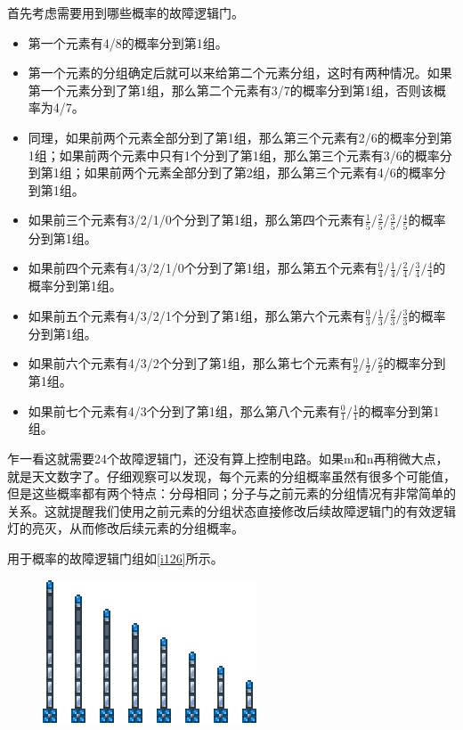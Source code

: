 首先考虑需要用到哪些概率的故障逻辑门。
\begin{itemize}
\item 第一个元素有4/8的概率分到第1组。
\item 第一个元素的分组确定后就可以来给第二个元素分组，这时有两种情况。如果第一个元素分到了第1组，那么第二个元素有3/7的概率分到第1组，否则该概率为4/7。
\item 同理，如果前两个元素全部分到了第1组，那么第三个元素有2/6的概率分到第1组；如果前两个元素中只有1个分到了第1组，那么第三个元素有3/6的概率分到第1组；如果前两个元素全部分到了第2组，那么第三个元素有4/6的概率分到第1组。
\item 如果前三个元素有3/2/1/0个分到了第1组，那么第四个元素有$\frac{1}{5}/\frac{2}{5}/\frac{3}{5}/\frac{4}{5}$的概率分到第1组。
\item 如果前四个元素有4/3/2/1/0个分到了第1组，那么第五个元素有$\frac{0}{4}/\frac{1}{4}/\frac{2}{4}/\frac{3}{4}/\frac{4}{4}$的概率分到第1组。
\item 如果前五个元素有4/3/2/1个分到了第1组，那么第六个元素有$\frac{0}{3}/\frac{1}{3}/\frac{2}{3}/\frac{3}{3}$的概率分到第1组。
\item 如果前六个元素有4/3/2个分到了第1组，那么第七个元素有$\frac{0}{2}/\frac{1}{2}/\frac{2}{2}$的概率分到第1组。
\item 如果前七个元素有4/3个分到了第1组，那么第八个元素有$\frac{0}{1}/\frac{1}{1}$的概率分到第1组。
\end{itemize}

乍一看这就需要24个故障逻辑门，还没有算上控制电路。如果m和n再稍微大点，就是天文数字了。仔细观察可以发现，每个元素的分组概率虽然有很多个可能值，但是这些概率都有两个特点：分母相同；分子与之前元素的分组情况有非常简单的关系。这就提醒我们使用之前元素的分组状态直接修改后续故障逻辑门的有效逻辑灯的亮灭，从而修改后续元素的分组概率。

用于概率的故障逻辑门组如\autoref{i126}所示。

\begin{figure}[!ht]
\centering
\includegraphics{images/126.png}
\caption{}
\label{i126}
\end{figure}

